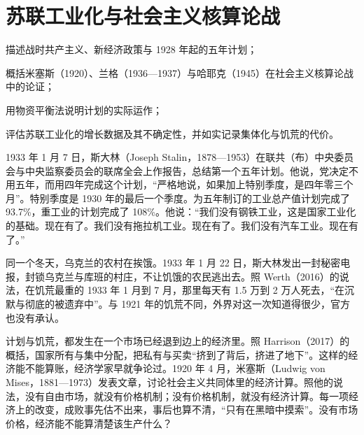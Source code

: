 \chapter{苏联工业化与社会主义核算论战}\label{ch:soviet}

\begin{chapterguide}
\begin{guidegoals}
\item 描述战时共产主义、新经济政策与 1928 年起的五年计划；
\item 概括米塞斯（1920）、兰格（1936—1937）与哈耶克（1945）在社会主义核算论战中的论证；
\item 用物资平衡法说明计划的实际运作；
\item 评估苏联工业化的增长数据及其不确定性，并如实记录集体化与饥荒的代价。
\end{guidegoals}
\end{chapterguide}

1933 年 1 月 7 日，斯大林（Joseph Stalin，1878—1953）在联共（布）中央委员会与中央监察委员会的联席全会上作报告，总结第一个五年计划\cite{stalin1933,loc31}。他说，党决定不用五年，而用四年完成这个计划，“严格地说，如果加上特别季度，是四年零三个月”\cite{stalin1933}。特别季度是 1930 年的最后一个季度\cite{gosplan1933}。为五年制订的工业总产值计划完成了 93.7\%，重工业的计划完成了 108\%\cite{stalin1933}。他说：“我们没有钢铁工业，这是国家工业化的基础。现在有了。我们没有拖拉机工业。现在有了。我们没有汽车工业。现在有了。”\cite{stalin1933}

同一个冬天，乌克兰的农村在挨饿。1933 年 1 月 22 日，斯大林发出一封秘密电报，封锁乌克兰与库班的村庄，不让饥饿的农民逃出去\cite{werth2016}。照 Werth（2016）的说法，在饥荒最重的 1933 年 1 月到 7 月，那里每天有 1.5 万到 2 万人死去，“在沉默与彻底的被遗弃中”\cite{werth2016}。与 1921 年的饥荒不同，外界对这一次知道得很少，官方也没有承认\cite{harrison2017}。

计划与饥荒，都发生在一个市场已经退到边上的经济里。照 Harrison（2017）的概括，国家所有与集中分配，把私有与买卖“挤到了背后，挤进了地下”\cite{harrison2017}。这样的经济能不能算账，经济学家早就争论过。1920 年 4 月，米塞斯（Ludwig von Mises，1881—1973）发表文章，讨论社会主义共同体里的经济计算\cite{mises1935,loc31}。照他的说法，没有自由市场，就没有价格机制；没有价格机制，就没有经济计算\cite{mises1935}。每一项经济上的改变，成败事先估不出来，事后也算不清，“只有在黑暗中摸索”\cite{mises1935}。没有市场价格，经济能不能算清楚该生产什么？

